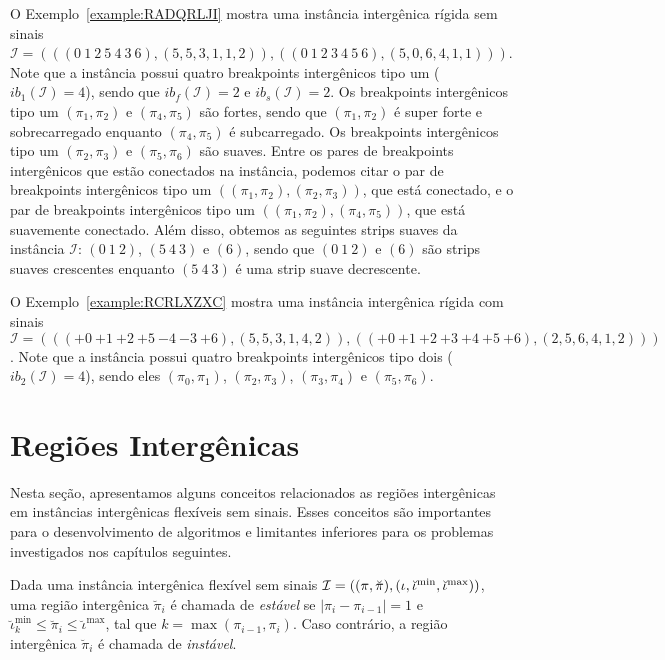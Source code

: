 O Exemplo~\ref{example:RADQRLJI} mostra uma instância intergênica rígida sem sinais $\mathcal{I} = (((0~1~2~5~4~3\allowbreak~6),\allowbreak(5,5,3,1,1,2)),\allowbreak((0~1~2~3~4~5~6),\allowbreak(5,0,6,4,1,1)))$. Note que a instância possui quatro breakpoints intergênicos tipo um ($ib_{1}(\mathcal{I}) = 4$), sendo que $ib_f(\mathcal{I}) = 2$ e $ib_s(\mathcal{I}) = 2$. Os breakpoints intergênicos tipo um $(\pi_1,\pi_2)$ e $(\pi_4,\pi_5)$ são fortes, sendo que $(\pi_1,\pi_2)$ é super forte e sobrecarregado enquanto $(\pi_4,\pi_5)$ é subcarregado. Os breakpoints intergênicos tipo um $(\pi_2,\pi_3)$ e $(\pi_5,\pi_6)$ são suaves. Entre os pares de breakpoints intergênicos que estão conectados na instância, podemos citar o par de breakpoints intergênicos tipo um $((\pi_1,\pi_2),(\pi_2,\pi_3))$, que está conectado, e o par de breakpoints intergênicos tipo um $((\pi_1,\pi_2),(\pi_4,\pi_5))$, que está suavemente conectado. Além disso, obtemos as seguintes strips suaves da instância $\mathcal{I}$: $(0~1~2)$, $(5~4~3)$ e $(6)$, sendo que $(0~1~2)$ e $(6)$ são strips suaves crescentes enquanto $(5~4~3)$ é uma strip suave decrescente.



O Exemplo~\ref{example:RCRLXZXC} mostra uma instância intergênica rígida com sinais $\mathcal{I} = \allowbreak((({+0}~{+1}~{+2}~\allowbreak{+5}~{-4}~{-3}~{+6}),\allowbreak(5,5,3,1,4,2)),\allowbreak(({+0}~{+1}~{+2}~{+3}~{+4}~{+5}~{+6}),\allowbreak(2,5,6,4,1,2)))$. Note que a instância possui quatro breakpoints intergênicos tipo dois ($ib_{2}(\mathcal{I}) = 4$), sendo eles $(\pi_0,\pi_1)$, $(\pi_2,\pi_3)$, $(\pi_3,\pi_4)$ e $(\pi_5,\pi_6)$.



\section{Regiões Intergênicas}

Nesta seção, apresentamos alguns conceitos relacionados as regiões intergênicas em instâncias intergênicas flexíveis sem sinais. Esses conceitos são importantes para o desenvolvimento de algoritmos e limitantes inferiores para os problemas investigados nos capítulos seguintes.

\begin{definition}
  Dada uma instância intergênica flexível sem sinais $\mathcal{I} = ((\pi,\breve\pi),\break(\iota,\breve\iota^{\min},\breve\iota^{\max}))$, uma região intergênica $\breve\pi_i$ é chamada de \emph{estável} se $|\pi_{i} - \pi_{i - 1}| = 1$ e $\breve\iota^{\min}_k \le \breve\pi_i \le \breve\iota^{\max}$, tal que $k = \max(\pi_{i-1}, \pi_i)$. Caso contrário, a região intergênica $\breve\pi_i$ é chamada de \emph{instável}. 
\end{definition}

